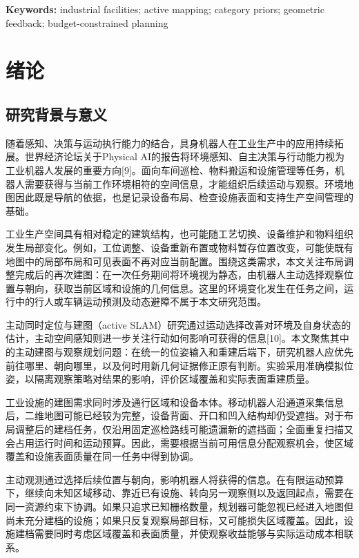 \documentclass[11pt,a4paper]{article}
\numberwithin{equation}{section}
\begin{document}
\noindent\textbf{Keywords:} industrial facilities; active mapping; category priors; geometric feedback; budget-constrained planning
\clearpage
{\small\linespread{.96}\selectfont\setlength{\parskip}{0pt}\tableofcontents}
\clearpage
{}
\hypertarget{ux7eeaux8bba}{%
\clearpage
\section{绪论}\label{ux7eeaux8bba}}

\hypertarget{ux7814ux7a76ux80ccux666fux4e0eux610fux4e49}{%
\subsection{研究背景与意义}\label{ux7814ux7a76ux80ccux666fux4e0eux610fux4e49}}

随着感知、决策与运动执行能力的结合，具身机器人在工业生产中的应用持续拓展。世界经济论坛关于Physical AI的报告将环境感知、自主决策与行动能力视为工业机器人发展的重要方向{[}9{]}。面向车间巡检、物料搬运和设施管理等任务，机器人需要获得与当前工作环境相符的空间信息，才能组织后续运动与观察。环境地图因此既是导航的依据，也是记录设备布局、检查设施表面和支持生产空间管理的基础。

工业生产空间具有相对稳定的建筑结构，也可能随工艺切换、设备维护和物料组织发生局部变化。例如，工位调整、设备重新布置或物料暂存位置改变，可能使既有地图中的局部布局和可见表面不再对应当前配置。围绕这类需求，本文关注布局调整完成后的再次建图：在一次任务期间将环境视为静态，由机器人主动选择观察位置与朝向，获取当前区域和设施的几何信息。这里的环境变化发生在任务之间，运行中的行人或车辆运动预测及动态避障不属于本文研究范围。

主动同时定位与建图（active SLAM）研究通过运动选择改善对环境及自身状态的估计，主动空间感知则进一步关注行动如何影响可获得的信息{[}10{]}。本文聚焦其中的主动建图与观察规划问题：在统一的位姿输入和重建后端下，研究机器人应优先前往哪里、朝向哪里，以及何时用新几何证据修正原有判断。实验采用准确模拟位姿，以隔离观察策略对结果的影响，评价区域覆盖和实际表面重建质量。

工业设施的建图需求同时涉及通行区域和设备本体。移动机器人沿通道采集信息后，二维地图可能已经较为完整，设备背面、开口和凹入结构却仍受遮挡。对于布局调整后的建档任务，仅沿用固定巡检路线可能遗漏新的遮挡面；全面重复扫描又会占用运行时间和运动预算。因此，需要根据当前可用信息分配观察机会，使区域覆盖和设施表面质量在同一任务中得到协调。

主动观测通过选择后续位置与朝向，影响机器人将获得的信息。在有限运动预算下，继续向未知区域移动、靠近已有设施、转向另一观察侧以及返回起点，需要在同一资源约束下协调。如果只追求已知栅格数量，规划器可能忽视已经进入地图但尚未充分建档的设施；如果只反复观察局部目标，又可能损失区域覆盖。因此，设施建档需要同时考虑区域覆盖和表面质量，并使观察收益能够与实际运动成本相联系。
\end{document}
